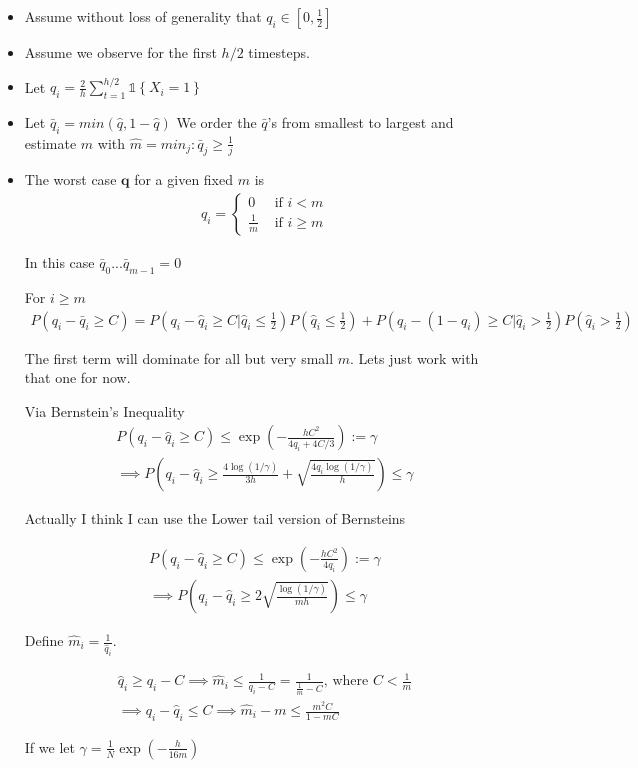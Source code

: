 \documentclass{article}
\newcommand{\set}[1]{\left\{#1\right\}}
\newcommand{\ind}[1]{\mathds{1}\!\!\set{#1}}
\newcommand{\eqn}[1]{\begin{align}#1\end{align}}
\newcommand{\eq}[1]{\begin{align*}#1\end{align*}}
\theoremstyle{plain}
\theoremstyle{definition}
\begin{document}
\begin{itemize}
\item Assume without loss of generality that $q_i \in [0,\frac{1}{2}]$

\item Assume we observe for the first $h/2$ timesteps.

\item Let $\hat{q}_i = \frac{2}{h}\sum_{t=1}^{h/2}\ind{X_i=1}$

\item Let $\bar{q}_i = min(\hat{q},1-\hat{q})$ We order the $\bar{q}$'s from smallest to largest and estimate $m$ with $\hat{m} = min_j : \bar{q}_j \geq \frac{1}{j}$ 

\item The worst case $\boldsymbol{q}$ for a given fixed $m$ is 
\eqn{
q_i = \begin{cases}
0 & \text{ if } i < m\\
\frac{1}{m} & \text{ if } i \geq m
\end{cases}
}

In this case $\bar{q}_0 ... \bar{q}_{m-1} = 0$

For $i \geq m$
\eq{
P(q_i - \bar{q}_i \geq C) = P(q_i - \hat{q}_i \geq C|\hat{q}_i\leq \frac{1}{2})P(\hat{q}_i \leq \frac{1}{2})+P(q_i - (1-\hat{q}_i) \geq C | \hat{q}_i > \frac{1}{2})P(\hat{q}_i>\frac{1}{2})
}

The first term will dominate for all but very small $m$. Lets just work with that one for now. 

Via Bernstein's Inequality
\eqn{
P(q_i - \hat{q}_i \geq C) \leq \exp(-\frac{hC^2}{4q_i+4C/3}) := \gamma \\
\implies P(q_i - \hat{q}_i \geq \frac{4\log(1/\gamma)}{3h}+\sqrt{\frac{4q_i\log(1/\gamma)}{h}})\leq \gamma
}

Actually I think I can use the Lower tail version  of Bernsteins

\eqn{
P(q_i - \hat{q}_i \geq C) \leq \exp(-\frac{hC^2}{4q_i}) := \gamma \\
\implies P(q_i - \hat{q}_i \geq 2\sqrt{\frac{\log(1/\gamma)}{mh}})\leq \gamma
}

Define $\hat{m}_i = \frac{1}{\hat{q}_i}$.

\eq{
\hat{q}_i \geq q_i - C \implies \hat{m}_i \leq \frac{1}{q_i-C} = \frac{1}{\frac{1}{m} - C} \text{, where } C < \frac{1}{m} \\
\implies q_i - \hat{q}_i \leq C \implies \hat{m}_i - m \leq \frac{m^2C}{1-mC}
}

If we let $\gamma =  \frac{1}{N}\exp(-{\frac{h}{16m}})$


\end{itemize}
\end{document}
